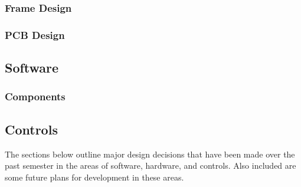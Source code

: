 \documentclass[12pt, titlepage]{article}
\begin{document}
\subsubsection{Frame Design}
\subsubsection{PCB Design}
\subsection{Software}
\subsubsection{Components}
\subsection{Controls}
The sections below outline major design decisions that have been made over the past semester in the areas of software, hardware, and controls. Also included are some future plans for development in these areas.
\end{document}
